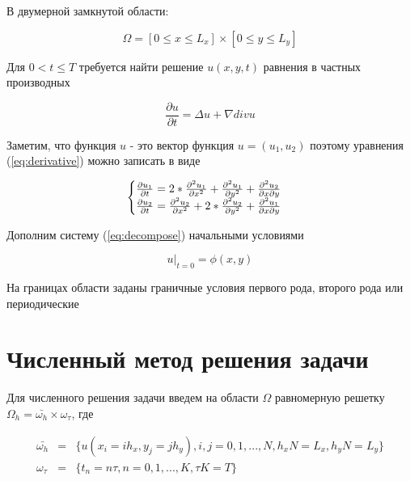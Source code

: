\documentclass[12pt,a4paper]{scrartcl}
\begin{document}
В двумерной замкнутой области:

\begin{equation}
    \Omega = [0 \leq x \leq L_x] \times [0 \leq y \leq L_y]
\end{equation}

Для $0 < t \leq T$ требуется найти решение $u(x,y,t)$ равнения в частных производных

\begin{equation}
    \label{eq:derivative}
    \frac{\partial u}{\partial t} = \Delta u + \nabla div u
\end{equation}

Заметим, что функция $u$ - это вектор функция $u=(u_1, u_2)$ поэтому уравнения (\ref{eq:derivative})
можно записать в виде

\begin{equation}
    \begin{cases} 
    \label{eq:decompose}
        \frac{\partial{u_1}}{\partial t} = 2 * \pdv[2]{u_1}{x} + \pdv[2]{u_1}{y} + \pdv{u_2}{x}{y} \\ 
        \frac{\partial{u_2}}{\partial t} = \pdv[2]{u_2}{x} + 2 * \pdv[2]{u_2}{y} + \pdv{u_1}{x}{y} \\ 
    \end{cases}
\end{equation}

Дополним систему (\ref{eq:decompose}) начальными условиями

\begin{equation}
    \label{eq:initialcondition}
    u|_{t = 0} = \phi(x, y)
\end{equation}

На границах области заданы граничные условия первого рода, второго рода или периодические
\newpage

\section{Численный метод решения задачи}

Для численного решения задачи введем на области $\Omega$ равномерную решетку
$\Omega_h = \bar{\omega_h} \times \omega_{\tau}$, где 

\begin{equation}
\begin{array}{lcl}
    \bar{\omega_{h}} & = & \{u(x_i = ih_x, y_j = jh_y),i,j = 0,1,...,N, h_xN = L_x, h_y N = L_y\} \\
    \omega_{\tau} & = & \{t_n = n\tau, n = 0,1,...,K, \tau K = T\} \\
\end{array}
\end{equation}
\end{document}

